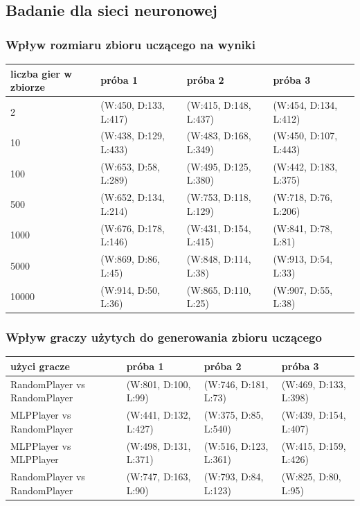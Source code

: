 \documentclass{article}
\begin{document}
\subsection{Badanie dla sieci neuronowej}

\subsubsection{Wpływ rozmiaru zbioru uczącego na wyniki}

\begin{center}
  \begin{tabular}{|l|l|l|l|}
    \hline
    liczba gier w zbiorze & próba 1 & próba 2 & próba 3 \\ \hline
    2 & (W:450, D:133, L:417) & (W:415, D:148, L:437) & (W:454, D:134, L:412) \\ \hline
    10 & (W:438, D:129, L:433) & (W:483, D:168, L:349) & (W:450, D:107, L:443) \\ \hline
    100 & (W:653, D:58, L:289) & (W:495, D:125, L:380) & (W:442, D:183, L:375) \\ \hline
    500 & (W:652, D:134, L:214) & (W:753, D:118, L:129) & (W:718, D:76, L:206) \\ \hline
    1000 & (W:676, D:178, L:146) & (W:431, D:154, L:415) & (W:841, D:78, L:81) \\ \hline
    5000 & (W:869, D:86, L:45) & (W:848, D:114, L:38) & (W:913, D:54, L:33) \\ \hline
    10000 & (W:914, D:50, L:36) & (W:865, D:110, L:25) & (W:907, D:55, L:38) \\ \hline
  \end{tabular}
\end{center}

\subsubsection{Wpływ graczy użytych do generowania zbioru uczącego}

\begin{center}
  \begin{tabular}{ | l | l | l | l | }
    \hline
    użyci gracze & próba 1 & próba 2 & próba 3 \\ \hline
    RandomPlayer vs RandomPlayer & (W:801, D:100, L:99) & (W:746, D:181, L:73) & (W:469, D:133, L:398) \\ \hline
    MLPPlayer vs RandomPlayer & (W:441, D:132, L:427) & (W:375, D:85, L:540) & (W:439, D:154, L:407) \\ \hline
    MLPPlayer vs MLPPlayer & (W:498, D:131, L:371) & (W:516, D:123, L:361) & (W:415, D:159, L:426) \\ \hline
    RandomPlayer vs RandomPlayer & (W:747, D:163, L:90) & (W:793, D:84, L:123) & (W:825, D:80, L:95) \\ \hline
  \end{tabular}
\end{center}
\end{document}
